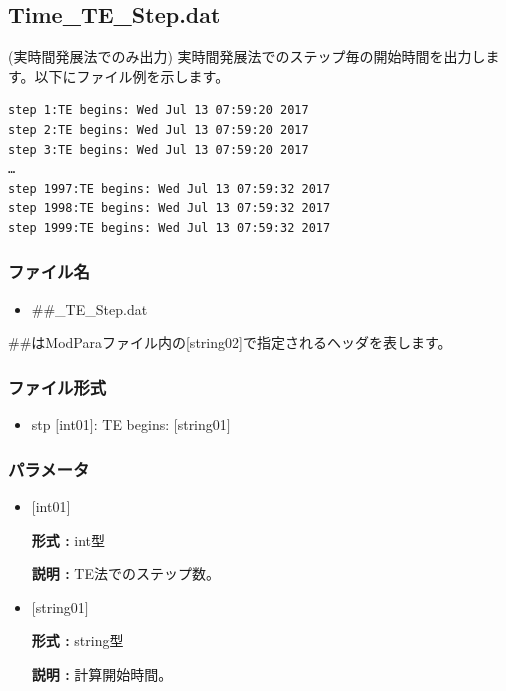 \newpage
\subsection{{Time\_TE\_Step.dat}}
(実時間発展法でのみ出力) 実時間発展法でのステップ毎の開始時間を出力します。以下にファイル例を示します。\\
\begin{minipage}{15cm}
\begin{screen}
\begin{verbatim}
step 1:TE begins: Wed Jul 13 07:59:20 2017
step 2:TE begins: Wed Jul 13 07:59:20 2017
step 3:TE begins: Wed Jul 13 07:59:20 2017
…
step 1997:TE begins: Wed Jul 13 07:59:32 2017
step 1998:TE begins: Wed Jul 13 07:59:32 2017
step 1999:TE begins: Wed Jul 13 07:59:32 2017
\end{verbatim}
\end{screen}
\end{minipage}

\subsubsection{ファイル名}
 \begin{itemize}
   \item  \#\#\_TE\_Step.dat
  \end{itemize}
  \#\#はModParaファイル内の[string02]で指定されるヘッダを表します。


\subsubsection{ファイル形式}
 \begin{itemize}
   \item stp $[$int01$]$: TE begins: $[$string01$]$
  \end{itemize}
\subsubsection{パラメータ}
 \begin{itemize}

  \item  $[$int01$]$
  
 {\bf 形式 :} int型

{\bf 説明 :} TE法でのステップ数。

  \item  $[$string01$]$
  
 {\bf 形式 :} string型

{\bf 説明 :} 計算開始時間。

 \end{itemize}

